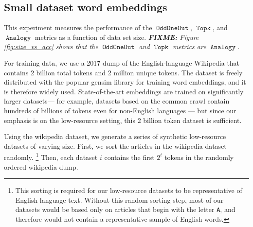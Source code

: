 \documentclass[11pt,a4paper]{article}
\DeclareMathOperator{\OddOneOut}{\texttt{OddOneOut}}
\DeclareMathOperator{\topk}{\texttt{Topk}}
\DeclareMathOperator{\analogy}{\texttt{Analogy}}
\newcommand{\fixme}[1]{{\color{red}\itshape \textbf{FIXME:} {#1}}}
\begin{document}
\subsection{Small dataset word embeddings}

This experiment measures the performance of the $\OddOneOut$, $\topk$, and $\analogy$ metrics as a function of data set size.
\fixme{Figure \ref{fig:size_vs_acc} shows that the $\OddOneOut$ and $\topk$ metrics are $\analogy$.}


For training data, we use a 2017 dump of the English-language Wikipedia 
that contains 2 billion total tokens and 2 million unique tokens.
The dataset is freely distributed with the popular gensim library \cite{rehurek_lrec} for training word embeddings,
and it is therefore widely used.
State-of-the-art embeddings are trained on significantly larger datasets---%
for example, datasets based on the common crawl contain hundreds of billions of tokens even for non-English languages \cite{buck2014n,grave2018learning}---%
but since our emphasis is on the low-resource setting,
this 2 billion token dataset is sufficient.

Using the wikipedia dataset, we generate a series of synthetic low-resource datasets of varying size.
First, we sort the articles in the wikipedia dataset randomly.%
\footnote{
    This sorting is required for our low-resource datasets to be representative of English language text.
    Without this random sorting step,
    most of our datasets would be based only on articles that begin with the letter \texttt{A},
    and therefore would not contain a representative sample of English words.
}
Then, each dataset $i$ contains the first $2^i$ tokens in the randomly ordered wikipedia dump.
\end{document}
